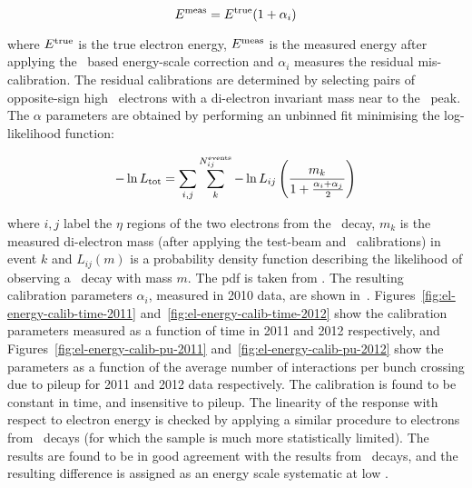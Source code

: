 \begin{equation}
E^{\rm meas} = E^{\rm true}(1 + \alpha_{i})
\end{equation}

where $E^{\rm true}$ is the true electron energy, $E^{\rm meas}$ is the measured
energy after applying the \mc\ based energy-scale correction and $\alpha_{i}$
measures the residual mis-calibration. The residual calibrations are determined
by selecting pairs of opposite-sign high \pt\ electrons with a di-electron
invariant mass near to the \Z\ peak. The $\alpha$ parameters are obtained by
performing an unbinned fit minimising the log-likelihood function:

\begin{equation}
-\ln L_{\rm tot} = \sum_{i,j} \sum^{N^{\rm events}_{ij}}_{k} -\ln
L_{ij} \left( \frac{m_{k}}{1+\frac{\alpha_{i} + \alpha_{j}}{2}} \right)
\end{equation}

where $i,j$ label the $\eta$ regions of the two electrons from the \Zee\ decay,
$m_{k}$ is the measured di-electron mass (after applying the test-beam and \mc\
calibrations) in event $k$ and $L_{ij}(m)$ is a probability density function
describing the likelihood of observing a \Zee\ decay with mass $m$. The pdf is
taken from \mcsim. The resulting calibration parameters $\alpha_{i}$, measured
in 2010 data, are shown in~\fig{el-energy-calib-const-2010}.
Figures~\ref{fig:el-energy-calib-time-2011}
and~\ref{fig:el-energy-calib-time-2012} show the calibration parameters measured
as a function of time in 2011 and 2012 respectively, and
Figures~\ref{fig:el-energy-calib-pu-2011}
and~\ref{fig:el-energy-calib-pu-2012} show the parameters as a function of
the average number of interactions per bunch crossing due to pileup for 2011 and 2012 data respectively. The calibration is found
to be constant in time, and insensitive to pileup. The linearity of the response
with respect to electron energy is checked by applying a similar procedure to electrons
from \JPsiee\ decays (for which the sample is much more statistically limited).
The results are found to be in good agreement with the results from \Zee\
decays, and the resulting difference is assigned as an energy scale systematic
at low \et.

